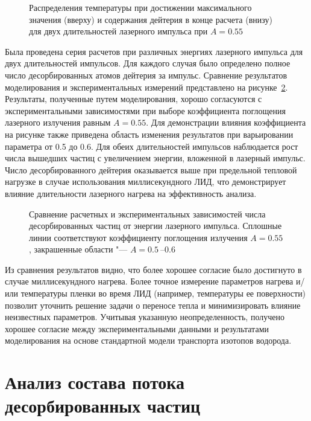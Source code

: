 \begin{figure}[ht]
    \caption{Распределения температуры при достижении максимального значения (вверху) и содержания дейтерия в конце расчета (внизу) для двух длительностей лазерного импульса при \( A = \num{0.55} \)}\label{fig:ch4/LID_2D}
\end{figure}

Была проведена серия расчетов при различных энергиях лазерного импульса для двух длительностей импульсов. Для каждого случая было определено полное число десорбированных атомов дейтерия за импульс. Сравнение результатов моделирования и экспериментальных измерений представлено на рисунке~\cref{fig:ch4/LID_Comparison}. Результаты, полученные путем моделирования, хорошо согласуются с экспериментальными зависимостями при выборе коэффициента поглощения лазерного излучения равным \(A=\num{0.55}\). Для демонстрации влияния коэффициента на рисунке также приведена область изменения результатов при варьировании параметра от \num{0.5} до \num{0.6}. Для обеих длительностей импульсов наблюдается рост числа вышедших частиц с увеличением энергии, вложенной в лазерный импульс. Число десорбированного дейтерия оказывается выше при предельной тепловой нагрузке в случае использования миллисекундного ЛИД, что демонстрирует влияние длительности лазерного нагрева на эффективность анализа.

\begin{figure}[ht]
    \caption{Сравнение расчетных и экспериментальных зависимостей числа десорбированных частиц от энергии лазерного импульса. Сплошные линии соответствуют коэффициенту поглощения излучения \( A=\num{0.55} \), закрашенные области "--- \( A = \SIrange{0.5}{0.6}{} \)}\label{fig:ch4/LID_Comparison}
\end{figure}

Из сравнения результатов видно, что более хорошее согласие было достигнуто в случае миллисекундного нагрева. Более точное измерение параметров нагрева и/или температуры пленки во время ЛИД (например, температуры ее поверхности) позволит уточнить решение задачи о переносе тепла и минимизировать влияние неизвестных параметров. Учитывая указанную неопределенность, получено хорошее согласие между экспериментальными данными и результатами моделирования на основе стандартной модели транспорта изотопов водорода.

\section{Анализ состава потока десорбированных частиц}\label{sec:ch4/seс2}

